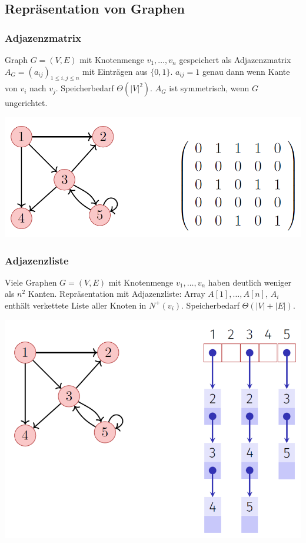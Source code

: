 \begin{sectionbox}
\subsection{Repräsentation von Graphen}\smallskip

\subsubsection{Adjazenzmatrix}\par\smallskip
Graph $G=(V, E)$ mit Knotenmenge $v_{1}, \ldots, v_{n}$ gespeichert als Adjazenzmatrix $A_{G}=\left(a_{i j}\right)_{1 \leq i, j \leq n}$ mit Einträgen aus $\{0,1\}$. $a_{i j}=1$ genau dann wenn Kante von $v_{i}$ nach $v_{j}$. Speicherbedarf $\Theta\left(|V|^{2}\right)$. $A_{G}$ ist symmetrisch, wenn $G$ ungerichtet.\par\smallskip
\begin{center}
    \includegraphics[width = 0.9\columnwidth]{../img/AdjMa.png}
\end{center}\vspace{10px}

\subsubsection{Adjazenzliste}\par\smallskip
Viele Graphen $G=(V, E)$ mit Knotenmenge $v_{1}, \ldots, v_{n}$ haben deutlich weniger als $n^{2}$ Kanten. Repräsentation mit Adjazenzliste: Array $A[1], \ldots, A[n]$, $A_{i}$ enthält verkettete Liste aller Knoten in $N^{+}\left(v_{i}\right)$. Speicherbedarf $\Theta\left(|V|+|E|\right)$.\par\smallskip
\begin{center}
    \includegraphics[width = 0.9\columnwidth]{../img/AdjList.png}
\end{center}\vspace{10px}


\end{sectionbox}
